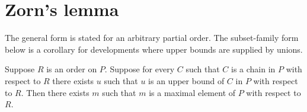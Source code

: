 \section{Zorn's lemma}




The general form is stated for an arbitrary partial order.  The
subset-family form below is a corollary for developments where upper
bounds are supplied by unions.

\begin{theorem}\label{zorn_partial_order}
    Suppose $R$ is an order on $P$.
    Suppose for every $C$ such that $C$ is a chain in $P$ with respect to $R$
        there exists $u$ such that $u$ is an upper bound of $C$ in $P$
            with respect to $R$.
    Then there exists $m$ such that $m$ is a maximal element of $P$
        with respect to $R$.
\end{theorem}
